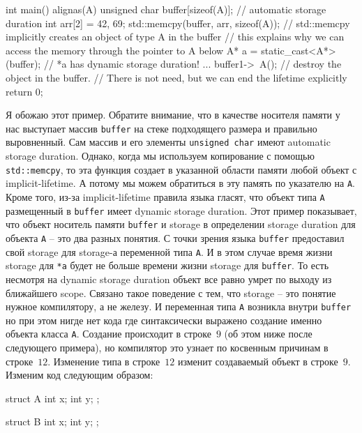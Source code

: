 \documentclass{article}
\begin{document}
\begin{enumerate}
\begin{cppcode}
int main() {
  alignas(A) unsigned char buffer[sizeof(A)]; // automatic storage duration
  int arr[2] = {42, 69};
  std::memcpy(buffer, arr, sizeof(A));
 // std::memcpy implicitly creates an object of type A in the buffer
 // this explains why we can access the memory through the pointer to A below
  A* a = static_cast<A*>(buffer); // *a has dynamic storage duration!
  ...
  buffer1->~A();  // destroy the object in the buffer.
  // There is not need, but we can end the lifetime explicitly
  return 0;
}
\end{cppcode}
Я обожаю этот пример.
Обратите внимание, что в качестве носителя памяти у нас выступает массив \verb"buffer" на стеке подходящего размера и правильно выровненный.
Сам массив и его элементы \verb"unsigned char" имеют automatic storage duration.
Однако, когда мы используем копирование с помощью \verb"std::memcpy", то эта функция создает в указанной области памяти любой объект с implicit-lifetime.
А потому мы можем обратиться в эту память по указателю на \verb"A".
Кроме того, из-за implicit-lifetime правила языка гласят, что объект типа \verb"A" размещенный в \verb"buffer" имеет dynamic storage duration.
Этот пример показывает, что объект носитель памяти \verb"buffer" и storage в определении storage duration для объекта \verb"A" -- это два разных понятия.
С точки зрения языка \verb"buffer" предоставил свой storage для storage-а переменной типа \verb"A".
И в этом случае время жизни storage для \verb"*a" будет не больше времени жизни storage для \verb"buffer".
То есть несмотря на dynamic storage duration объект все равно умрет по выходу из ближайшего scope.
Связано такое поведение с тем, что storage -- это понятие нужное компилятору, а не железу.
И переменная типа \verb"A" возникла внутри \verb"buffer" но при этом нигде нет кода где синтаксически выражено создание именно объекта класса \verb"A".
Создание происходит в строке~$9$ (об этом ниже после следующего примера), но компилятор это узнает по косвенным причинам в строке~$12$.
Изменение типа в строке~$12$ изменит создаваемый объект в строке~$9$.
Изменим код следующим образом:
\begin{cppcode}
struct A {
  int x;
  int y;
};

struct B {
  int x;
  int y;
};


\end{cppcode}
\end{enumerate}
\end{document}
